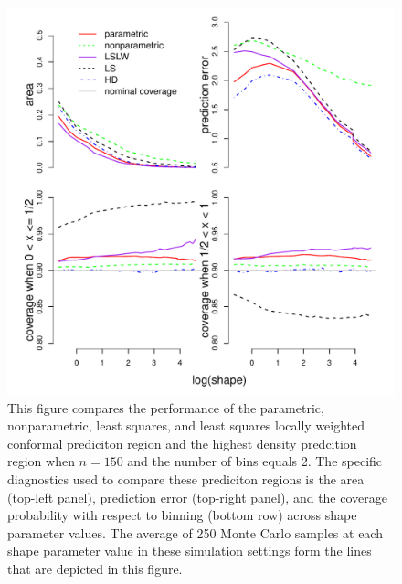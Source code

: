 \documentclass[11pt]{article}\usepackage[]{graphicx}\usepackage[]{color}
\makeatletter
\def\maxwidth{ %
  \ifdim\Gin@nat@width>\linewidth
    \linewidth
  \else
    \Gin@nat@width
  \fi
}
\newenvironment{knitrout}{}{} %
\makeatother
\begin{document}
\newpage
\begin{figure}[h!]
\begin{center}
\begin{knitrout}
\color{fgcolor}
\includegraphics[width=\maxwidth]{figure/Fig-gamma-150-1} 

\end{knitrout}
\end{center}
\caption{This figure compares the performance of the 
  parametric,
  nonparametric,
  least squares, and 
  least squares locally weighted conformal prediciton region and the 
  highest density predcition region when $n = 150$ and the number of bins 
  equals 2.  
  The specific diagnostics used to compare these prediciton regions is the 
    area (top-left panel),
    prediction error (top-right panel), and
    the coverage probability with respect to binning (bottom row) 
    across shape parameter values.
  The average of 250 Monte Carlo samples at each shape parameter value in 
  these simulation settings form the lines that are depicted in this figure.}
\label{Fig:gamma.150}
\end{figure}
\end{document}
